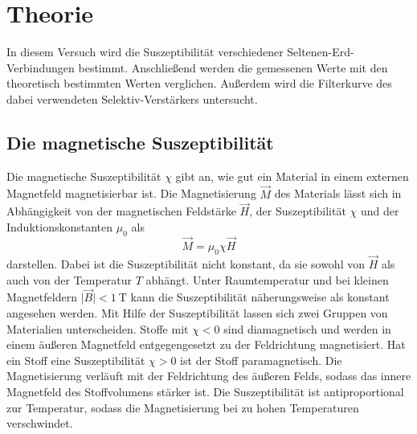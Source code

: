 \section{Theorie}
\label{sec:Theorie}
In diesem Versuch wird die Suszeptibilität verschiedener Seltenen-Erd-Verbindungen bestimmt. 
Anschließend werden die gemessenen Werte mit den theoretisch bestimmten Werten verglichen.
Außerdem wird die Filterkurve des dabei verwendeten Selektiv-Verstärkers untersucht. 
\\
\subsection{Die magnetische Suszeptibilität}
Die magnetische Suszeptibilität $\chi$ gibt an, wie gut ein Material in einem externen Magnetfeld magnetisierbar ist.
Die Magnetisierung $\vec{M}$ des Materials lässt sich in Abhängigkeit von der magnetischen Feldstärke $\vec{H}$, der Suszeptibilität $\chi$ und der 
Induktionskonstanten $\mu_0$ als
\begin{equation}
    \vec{M}=\mu_0 \chi \vec{H}
\end{equation}
darstellen. Dabei ist die Suszeptibilität nicht konstant, da sie sowohl von $\vec{H}$ als auch von der Temperatur $T$ abhängt. Unter Raumtemperatur und bei kleinen Magnetfeldern $\lvert \vec{B} \rvert <\SI{1}{\tesla}$
kann die Suszeptibilität näherungsweise als konstant angesehen werden. Mit Hilfe der Suszeptibilität lassen sich zwei Gruppen von Materialien unterscheiden.
Stoffe mit $\chi<0$ sind diamagnetisch und werden in einem äußeren Magnetfeld entgegengesetzt zu der Feldrichtung magnetisiert. Hat ein Stoff eine Suszeptibilität $\chi>0$ ist der Stoff
paramagnetisch. Die Magnetisierung verläuft mit der Feldrichtung des äußeren Felds, sodass das innere Magnetfeld des Stoffvolumens stärker ist. Die Suszeptibilität
ist antiproportional zur Temperatur, sodass die Magnetisierung bei zu hohen Temperaturen verschwindet.
\\
